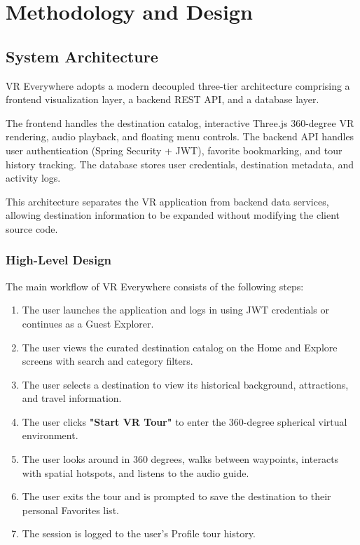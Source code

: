 \documentclass{tietreport}
\begin{document}

\chapter{Methodology and Design}

\section{System Architecture}

VR Everywhere adopts a modern decoupled three-tier architecture comprising a frontend visualization layer, a backend REST API, and a database layer.

The frontend handles the destination catalog, interactive Three.js 360-degree VR rendering, audio playback, and floating menu controls. The backend API handles user authentication (Spring Security + JWT), favorite bookmarking, and tour history tracking. The database stores user credentials, destination metadata, and activity logs.

This architecture separates the VR application from backend data services, allowing destination information to be expanded without modifying the client source code.

\subsection{High-Level Design}

The main workflow of VR Everywhere consists of the following steps:

\begin{enumerate}
  \item The user launches the application and logs in using JWT credentials or continues as a Guest Explorer.
  \item The user views the curated destination catalog on the Home and Explore screens with search and category filters.
  \item The user selects a destination to view its historical background, attractions, and travel information.
  \item The user clicks \textbf{"Start VR Tour"} to enter the 360-degree spherical virtual environment.
  \item The user looks around in 360 degrees, walks between waypoints, interacts with spatial hotspots, and listens to the audio guide.
  \item The user exits the tour and is prompted to save the destination to their personal Favorites list.
  \item The session is logged to the user's Profile tour history.
\end{enumerate}
\end{document}
